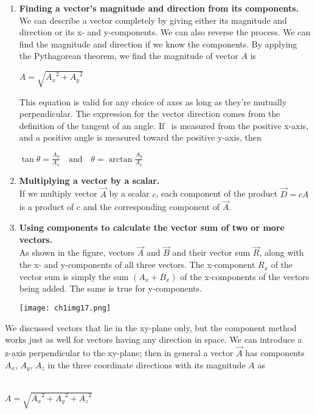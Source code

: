 \begin{enumerate}
\item \textbf{Finding a vector's magnitude and direction from its components.}\\
We can describe a vector completely by giving either its magnitude and direction or its x- and y-components. We can also reverse the process. We can find the magnitude and direction if we know the components. By applying the Pythagorean theorem, we find the magnitude of vector $A$ is
\begin{mathbox}
\centerline{$A = \sqrt{{A_x}^2 + {A_y}^2}$}
\end{mathbox}
This equation is valid for any choice of axes as long as they're mutually perpendicular. The expression for the vector direction comes from the definition of the tangent of an angle. If \theta\, is measured from the positive x-axis, and a positive angle is measured toward the positive y-axis, then
\begin{mathbox}
\centerline{$\tan \theta = \frac{A_y}{A_x} \quad \text{and} \quad \theta = \arctan \frac{A_y}{A_x}$}
\end{mathbox}
\item \textbf{Multiplying a vector by a scalar.}\\
If we multiply vector $\overrightarrow{A}$ by a scalar $c$, each component of the product $\overrightarrow{D} = c A$ is a product of c and the corresponding component of $\overrightarrow{A}$.\\
\item \textbf{Using components to calculate the vector sum of two or more vectors.}\\
As shown in the figure, vectors $\overrightarrow{A}$ and $\overrightarrow{B}$ and their vector sum $\overrightarrow{R}$, along with the x- and y-components of all three vectors. The x-component $R_x$ of the vector sum is simply the sum $\left(A_x + B_x\right)$ of the x-components of the vectors being added. The same is true for y-components.
\begin{center}
\texttt{[image: ch1img17.png]}
\end{center}
\end{enumerate}

We discussed vectors that lie in the xy-plane only, but the component method works just as well for vectors having any direction in space. We can introduce a z-axis perpendicular to the xy-plane; then in general a vector $\overrightarrow{A}$  has components $A_x$, $A_y$, $A_z$ in the three coordinate directions with its magnitude $A$ as\\\\
\centerline{$A = \sqrt{{A_x}^2 + {A_y}^2 + {A_z}^2}$}

